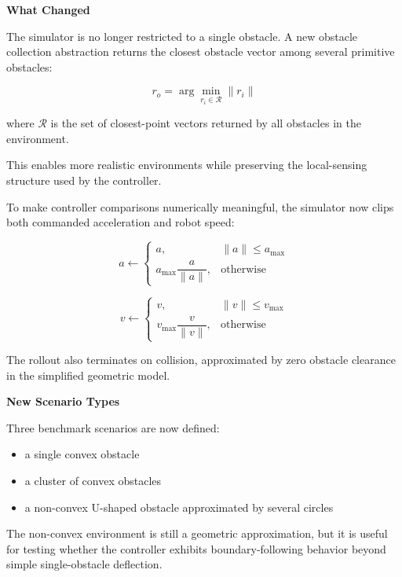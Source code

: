 \documentclass[11pt]{article}
\begin{document}
\textbf{What Changed}

The simulator is no longer restricted to a single obstacle. A new obstacle
collection abstraction returns the closest obstacle vector among several
primitive obstacles:

\begin{equation}
r_o = \arg\min_{r_i \in \mathcal{R}} \lVert r_i \rVert
\end{equation}

where $\mathcal{R}$ is the set of closest-point vectors returned by all
obstacles in the environment.

This enables more realistic environments while preserving the local-sensing
structure used by the controller.

To make controller comparisons numerically meaningful, the simulator now clips
both commanded acceleration and robot speed:

\begin{equation}
a \leftarrow
\begin{cases}
a, & \lVert a \rVert \le a_{\max} \\
a_{\max}\dfrac{a}{\lVert a \rVert}, & \text{otherwise}
\end{cases}
\end{equation}

\begin{equation}
v \leftarrow
\begin{cases}
v, & \lVert v \rVert \le v_{\max} \\
v_{\max}\dfrac{v}{\lVert v \rVert}, & \text{otherwise}
\end{cases}
\end{equation}

The rollout also terminates on collision, approximated by zero obstacle
clearance in the simplified geometric model.

\textbf{New Scenario Types}

Three benchmark scenarios are now defined:

\begin{itemize}[leftmargin=*]
  \item a single convex obstacle
  \item a cluster of convex obstacles
  \item a non-convex U-shaped obstacle approximated by several circles
\end{itemize}

The non-convex environment is still a geometric approximation, but it is useful
for testing whether the controller exhibits boundary-following behavior beyond
simple single-obstacle deflection.
\end{document}
